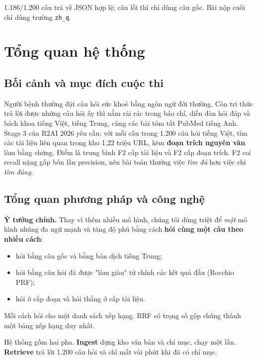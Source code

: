 \documentclass[10.5pt,a4paper]{article}
\begin{document}
1.186/1.200 câu trả về JSON hợp lệ; câu lỗi thì chỉ dùng câu gốc. Bài nộp cuối chỉ dùng trường \texttt{zh\_q}.

\section{Tổng quan hệ thống}

\subsection{Bối cảnh và mục đích cuộc thi}

Người bệnh thường đặt câu hỏi sức khoẻ bằng ngôn ngữ đời thường. Còn tri thức trả lời được những câu hỏi ấy thì nằm rải rác trong báo chí, diễn đàn hỏi đáp và bách khoa tiếng Việt, tiếng Trung, cùng các bài tóm tắt PubMed tiếng Anh. Stage 3 của R2AI 2026 yêu cầu: với mỗi câu trong 1.200 câu hỏi tiếng Việt, tìm các tài liệu liên quan trong kho 1,22 triệu URL, kèm \textbf{đoạn trích nguyên văn} làm bằng chứng. Điểm là trung bình F2 cấp tài liệu và F2 cấp đoạn trích. F2 coi recall nặng gấp bốn lần precision, nên bài toán thưởng việc \emph{tìm đủ} hơn việc chỉ \emph{tìm đúng}.

\subsection{Tổng quan phương pháp và công nghệ}

\begin{note}
\textbf{Ý tưởng chính.} Thay vì thêm nhiều mô hình, chúng tôi dùng triệt để \emph{một} mô hình nhúng đa ngữ mạnh và tăng độ phủ bằng cách \textbf{hỏi cùng một câu theo nhiều cách}:
\begin{itemize}
  \item hỏi bằng câu gốc và bằng bản dịch tiếng Trung;
  \item hỏi bằng câu hỏi đã được "làm giàu" từ chính các kết quả đầu (Rocchio PRF);
  \item hỏi ở cấp đoạn và hỏi thẳng ở cấp tài liệu.
\end{itemize}
Mỗi cách hỏi cho một danh sách xếp hạng. RRF có trọng số gộp chúng thành một bảng xếp hạng duy nhất.
\end{note}

Hệ thống gồm hai pha. \textbf{Ingest} dựng kho văn bản và chỉ mục, chạy một lần. \textbf{Retrieve} trả lời 1.200 câu hỏi và chỉ mất vài phút khi đã có chỉ mục.
\end{document}

